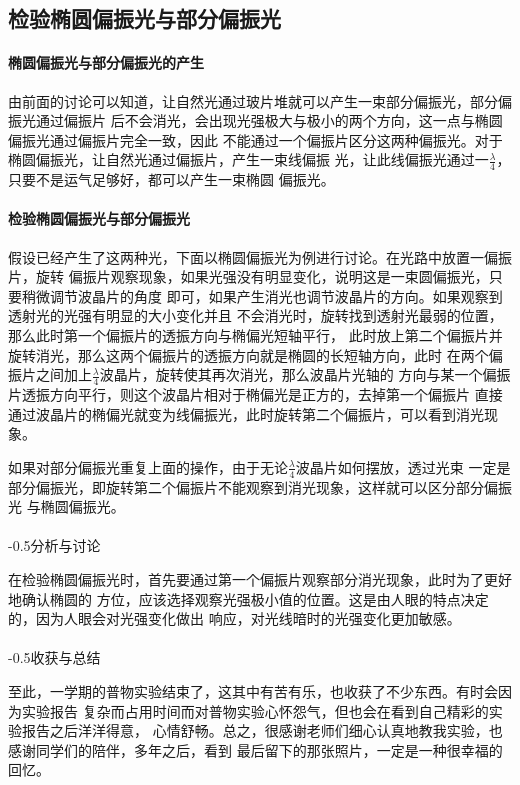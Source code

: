 \documentclass[a4paper]{ctexart}
\makeatletter
\renewcommand{\section}{\@startsection{section}{1}{0mm}
	{-\baselineskip}{0.5\baselineskip}{\bf\leftline}}
\makeatother
\begin{document}
    \subsection{检验椭圆偏振光与部分偏振光}
    \paragraph{椭圆偏振光与部分偏振光的产生}
    由前面的讨论可以知道，让自然光通过玻片堆就可以产生一束部分偏振光，部分偏振光通过偏振片
    后不会消光，会出现光强极大与极小的两个方向，这一点与椭圆偏振光通过偏振片完全一致，因此
    不能通过一个偏振片区分这两种偏振光。对于椭圆偏振光，让自然光通过偏振片，产生一束线偏振
    光，让此线偏振光通过一$\frac{\lambda}{4}$，只要不是运气足够好，都可以产生一束椭圆
    偏振光。
    \paragraph{检验椭圆偏振光与部分偏振光}
    假设已经产生了这两种光，下面以椭圆偏振光为例进行讨论。在光路中放置一偏振片，旋转
    偏振片观察现象，如果光强没有明显变化，说明这是一束圆偏振光，只要稍微调节波晶片的角度
    即可，如果产生消光也调节波晶片的方向。如果观察到透射光的光强有明显的大小变化并且
    不会消光时，旋转找到透射光最弱的位置，那么此时第一个偏振片的透振方向与椭偏光短轴平行，
    此时放上第二个偏振片并旋转消光，那么这两个偏振片的透振方向就是椭圆的长短轴方向，此时
    在两个偏振片之间加上$\frac{\lambda}{4}$波晶片，旋转使其再次消光，那么波晶片光轴的
    方向与某一个偏振片透振方向平行，则这个波晶片相对于椭偏光是正方的，去掉第一个偏振片
    直接通过波晶片的椭偏光就变为线偏振光，此时旋转第二个偏振片，可以看到消光现象。
    \par
    如果对部分偏振光重复上面的操作，由于无论$\frac{\lambda}{4}$波晶片如何摆放，透过光束
    一定是部分偏振光，即旋转第二个偏振片不能观察到消光现象，这样就可以区分部分偏振光
    与椭圆偏振光。\\
    \\
    \section{\large{分析与讨论}}
    \par 
    在检验椭圆偏振光时，首先要通过第一个偏振片观察部分消光现象，此时为了更好地确认椭圆的
    方位，应该选择观察光强极小值的位置。这是由人眼的特点决定的，因为人眼会对光强变化做出
    响应，对光线暗时的光强变化更加敏感。\\
    \\
    \section{\large{收获与总结}}
    \par 
    至此，一学期的普物实验结束了，这其中有苦有乐，也收获了不少东西。有时会因为实验报告
    复杂而占用时间而对普物实验心怀怨气，但也会在看到自己精彩的实验报告之后洋洋得意，
    心情舒畅。总之，很感谢老师们细心认真地教我实验，也感谢同学们的陪伴，多年之后，看到
    最后留下的那张照片，一定是一种很幸福的回忆。
\end{document}
